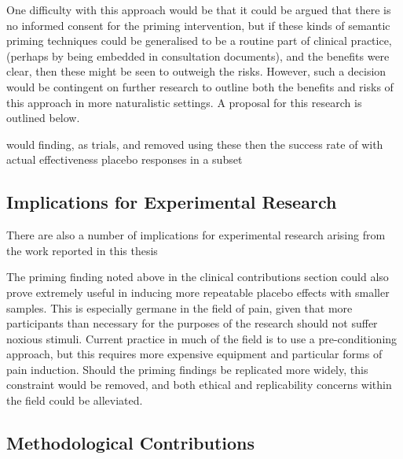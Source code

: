 One difficulty with this approach would be that it could be argued
that there is no informed consent for the priming intervention, but if
these kinds of semantic priming techniques could be generalised to be
a routine part of clinical practice, (perhaps by being embedded in
consultation documents), and the benefits were clear, then these might
be seen to outweigh the risks. However, such a decision would be
contingent on further research to outline both the benefits and risks
of this approach in more naturalistic settings. A proposal for this
research is outlined below.

would %
finding, as %
trials, and %
removed using these %
then the success rate of %
with actual effectiveness %
placebo responses in a subset %

\subsection{Implications for Experimental Research}
\label{sec:impl-exper-rese}

There are also a number of implications for experimental research
arising from the work reported in this thesis

The priming finding noted above in the clinical contributions section
could also prove extremely useful in inducing more repeatable placebo
effects with smaller samples. This is especially germane in the field
of pain, given that more participants than necessary for the purposes
of the research should not suffer noxious stimuli. Current practice in
much of the field is to use a pre-conditioning approach, but this
requires more expensive equipment and particular forms of pain
induction. Should the priming findings be replicated more widely, this
constraint would be removed, and both ethical and replicability
concerns within the field could be alleviated.



\subsection{Methodological Contributions}
\label{sec:meth-contr}

